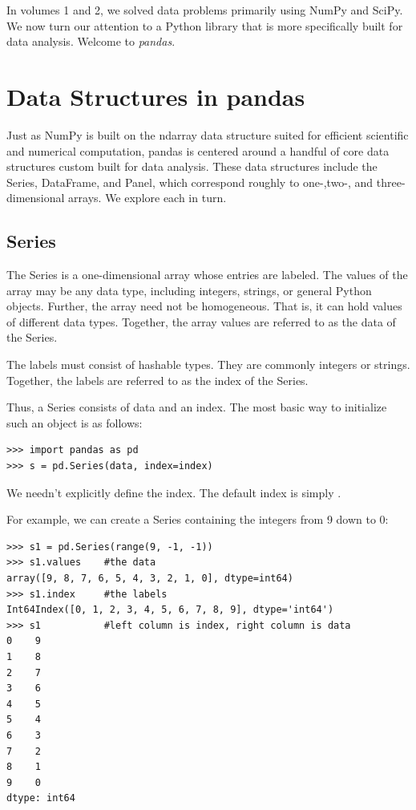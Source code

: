 
In volumes 1 and 2, we solved data problems primarily using NumPy and SciPy.
We now turn our attention to a Python library that is more specifically built for data analysis. Welcome to \emph{pandas}.

\section*{Data Structures in pandas}
Just as NumPy is built on the ndarray data structure suited for efficient scientific and numerical computation, pandas is centered around a handful of core data structures custom built for data analysis. These data structures include the Series, DataFrame, and Panel, which correspond roughly to one-,two-, and three-dimensional arrays. We explore each in turn.

\subsection*{Series}
The Series is a one-dimensional array whose entries are labeled. The values of the array may be
any data type, including integers, strings, or general Python objects. Further, the array
need not be homogeneous. That is, it can hold values of different data types. Together, the array values are referred to as the data of the Series.

The labels must consist of hashable types. They are commonly integers or strings.
Together, the labels are referred to as the index of the Series.

Thus, a Series consists of data and an index. The most basic way to initialize such an object
is as follows:
\begin{lstlisting}
>>> import pandas as pd
>>> s = pd.Series(data, index=index)
\end{lstlisting}
We needn't explicitly define the index. The default index is simply .

For example, we can create a Series containing the integers from 9 down to 0:
\begin{lstlisting}
>>> s1 = pd.Series(range(9, -1, -1))
>>> s1.values    #the data
array([9, 8, 7, 6, 5, 4, 3, 2, 1, 0], dtype=int64)
>>> s1.index     #the labels
Int64Index([0, 1, 2, 3, 4, 5, 6, 7, 8, 9], dtype='int64')
>>> s1           #left column is index, right column is data
0    9
1    8
2    7
3    6
4    5
5    4
6    3
7    2
8    1
9    0
dtype: int64
\end{lstlisting}

